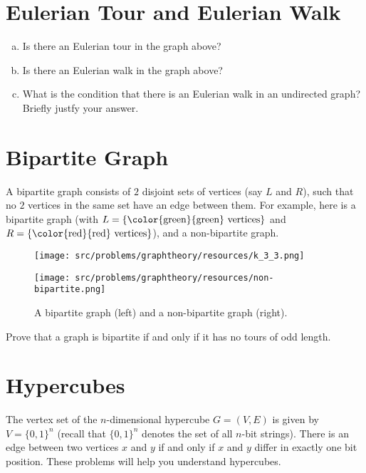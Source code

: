 \documentclass[11pt, notitlepage]{report}
\newcommand{\Question}[1]{\newpage\section{#1}}
\begin{document}
\Question{Eulerian Tour and Eulerian Walk}

\begin{enumerate}[(a)]
    \item Is there an Eulerian tour in the graph above?

    \item Is there an Eulerian walk in the graph above?

    \item What is the condition that there is an Eulerian walk in an undirected graph? Briefly justfy your answer.
\end{enumerate}
\nosolspace{1cm}


\Question{Bipartite Graph}

A bipartite graph consists of $2$ disjoint sets of vertices (say $L$ and $R$), such that no $2$ vertices in the same set have an edge between them. 
For example, here is a bipartite graph (with $L=\{\hbox{{\color{green}{green}} vertices}\}$ and $R =\{\hbox{{\color{red}{red}} vertices}\}$),  and a non-bipartite graph.

	\begin{figure}[hpb]
\begin{minipage}{0.49\textwidth}
	\centering
	\texttt{[image: src/problems/graphtheory/resources/k\_3\_3.png]}
\end{minipage}
\begin{minipage}{0.49\textwidth}
	\centering
	\texttt{[image: src/problems/graphtheory/resources/non-bipartite.png]}
\end{minipage}
\caption{A bipartite graph (left) and a non-bipartite graph (right).}
	\label{fig:bipartite}
	\end{figure}

Prove that a graph is bipartite if and only if it has no tours of odd length.
\nosolspace{1in}


\Question{Hypercubes}

The vertex set of the $n$-dimensional hypercube $G=(V,E)$ is given by $V=\{0,1\}^n$ (recall that $\{0,1\}^n$ denotes the set of all $n$-bit strings). There is an edge between two vertices $x$ and $y$ if and only if $x$ and $y$ differ in exactly one bit position. These problems will help you understand hypercubes.
\end{document}

